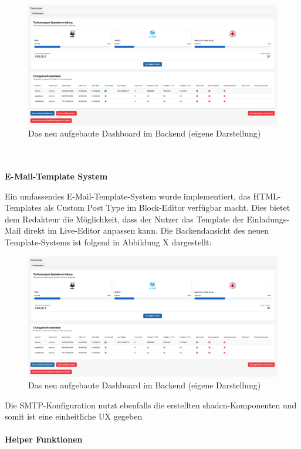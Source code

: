 \begin{figure}[H]
    \centering
    \includegraphics[width=1\textwidth]{images/new_dashboard_backend}
    \caption{Das neu aufgebaute Dashboard im Backend (eigene Darstellung)}
    \label{fig:new-dashboard-backend}
\end{figure}

\\\\
\textbf{E-Mail-Template System}

Ein umfassendes E-Mail-Template-System wurde implementiert, das HTML-Templates als Custom Post Type im Block-Editor verfügbar macht.
Dies bietet dem Redakteur die Möglichkeit, dass der Nutzer das Template der Einladungs-Mail direkt im Live-Editor anpassen kann.
Die Backendansicht des neuen Template-Systems ist folgend in Abbildung X dargestellt:

\begin{figure}[H]
    \centering
    \includegraphics[width=1\textwidth]{images/new_dashboard_backend}
    \caption{Das neu aufgebaute Dashboard im Backend (eigene Darstellung)}
    \label{fig:new-dashboard-backend}
\end{figure}

Die SMTP-Konfiguration nutzt ebenfalls die erstellten shadcn-Komponenten und somit ist eine einheitliche UX gegeben %
\\\\
\textbf{Helper Funktionen}

